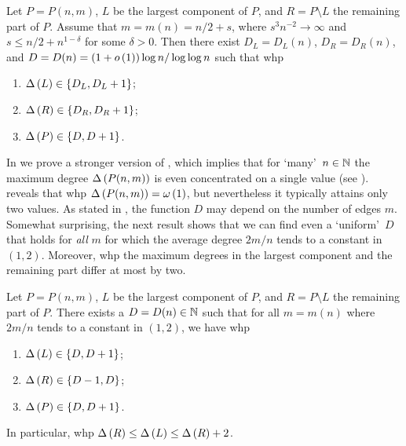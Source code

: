 \begin{thm}\label{thm:main_max_degree_pnm}
Let $P=P(n,m)$, $L$ be the largest component of $P$, and $R=P\setminus L$ the remaining part of $P$. Assume that $m=m(n)=n/2+s$, where $s^3n^{-2}\to \infty$ and $s\leq n/2+n^{1-\delta}$ for some $\delta>0$. Then there exist $D_L=D_L(n)$, $D_R=D_R(n)$, and $D=D(n)=\left(1+o\left(1\right)\right)\log n/\log\log n$ such that whp 
\begin{enumerate}
    \item 
    $\Delta\left(L\right)\in \left\{D_L, D_L+1\right\}$;
    \item
    $\Delta\left(R\right)\in \left\{D_R, D_R+1\right\}$;
    \item
    $\Delta\left(P\right)\in \left\{D, D+1\right\}$.
\end{enumerate}
\end{thm}

In  we prove a stronger version of , which implies that for \lq many\rq\ $n\in\mathbb{N}$ the maximum degree $\Delta\left(P(n,m)\right)$ is even concentrated on a single value (see ).  reveals that whp $\Delta\left(P(n,m)\right)=\omega\left(1\right)$, but nevertheless it typically attains only two values. As stated in , the function $D$ may depend on the number of edges $m$. Somewhat surprising, the next result shows that we can find even a \lq uniform\rq\ $D$ that holds for {\em all} $m$ for which the average degree $2m/n$ tends to a constant in $(1,2)$. Moreover, whp the maximum degrees in the largest component and the remaining part differ at most by two.


\begin{thm}\label{thm:main_max_degree_independent}
Let $P=P(n,m)$, $L$ be the largest component of $P$, and $R=P\setminus L$ the remaining part of $P$. There exists a $D=D(n)\in \mathbb{N}$ such that for all $m=m(n)$ where $2m/n$ tends to a constant in $(1,2)$, we have whp
\begin{enumerate}
\item
$\Delta\left(L\right)\in \left\{D, D+1\right\}$;
\item
$\Delta\left(R\right)\in \left\{D-1, D\right\}$;
\item
$\Delta\left(P\right)\in \left\{D, D+1\right\}$.
\end{enumerate}
In particular, whp $\Delta\left(R\right)\leq\Delta\left(L\right)\leq\Delta\left(R\right)+2$.
\end{thm}

